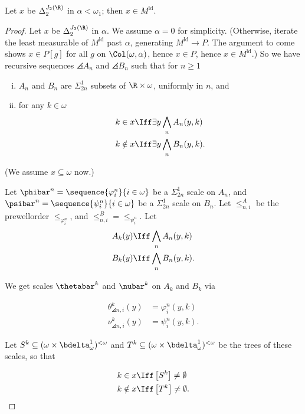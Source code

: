\documentclass[oneside,12pt]{amsart}
\begin{document}
\begin{theorem} Let $x$ be $\Delta_2^{J_2(\R)}$ in $\alpha<\omega_1$;
then $x\in M^{\text{ld}}$.
\end{theorem}

\begin{proof}
Let $x$ be $\Delta_2^{J_2(\R)}$ in $\alpha$. We assume $\alpha=0$ for simplicity.
(Otherwise, iterate the least measurable of $M^{\text{ld}}$ past $\alpha$, generating
$M^{\text{ld}}\to P$. The argument to come shows $x\in P[g]$ for all $g$
on $\Col(\omega,\alpha)$, hence $x\in P$, hence $x\in M^{\text{ld}}$.)
So we have recursive sequences $\angles{A_n}$ and $\angles{B_n}$ such that
for $n\geq 1$
\begin{enumerate}[(i)]
\item $A_n$ and $B_n$ are $\Sigma^1_{2n}$ subsets of $\R\times\omega$,
uniformly in $n$, and
\item for any $k\in\omega$
\begin{align*}
k\in x &\Iff \exists y \bigwedge_n A_n(y,k) \\
k\notin x &\Iff \exists y \bigwedge_n B_n(y,k). \\
\end{align*}
\end{enumerate}
(We assume $x\subseteq\omega$ now.)

Let $\phibar^n=\sequence{\varphi^n_i}{i\in\omega}$ be a $\Sigma^1_{2n}$
scale on $A_n$, and $\psibar^n=\sequence{\psi^n_i}{i\in\omega}$ be a $\Sigma^1_{2n}$
scale on $B_n$. Let $\leq^A_{n,i}$ be the prewellorder
$\leq_{\varphi^n_i}$, and $\leq^B_{n,i}=\leq_{\psi^n_i}$. Let
\begin{align*}
A_k(y) &\Iff  \bigwedge_n A_n(y,k) \\
B_k(y) &\Iff  \bigwedge_n B_n(y,k).
\end{align*}

We get scales $\thetabar^k$ and $\nubar^k$ on $A_k$ and $B_k$ via

\begin{align*}
\theta^k_{\angles{n,i}}(y) &= \varphi^n_i(y,k) \\
\nu^k_{\angles{n,i}}(y) &= \psi^n_i(y,k).
\end{align*}

Let $S^k\subseteq(\omega \times \bdelta^1_{\omega})^{<\omega}$ and
$T^k\subseteq(\omega \times \bdelta^1_{\omega})^{<\omega}$  be the trees of these scales,
so that

\begin{align*}
k\in x &\Iff \left[ S^k \right] \not= \emptyset \\
k\notin x &\Iff \left[ T^k \right] \not= \emptyset.
\end{align*}


\end{proof}
\end{document}
